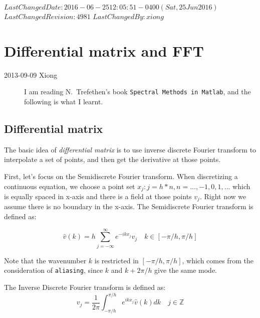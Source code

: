 \ifsvnmulti
 {$LastChangedDate: 2016-06-25 12:05:51 -0400 (Sat, 25 Jun 2016) $}
 {$LastChangedRevision: 4981 $} {$LastChangedBy: xiong $}
\fi


\section{Differential matrix and FFT}
\label{sect:DiffMat}


\begin{description}

\item[2013-09-09 Xiong]
I am reading N.~Trefethen's book \texttt{Spectral Methods in Matlab}, and
the following is what I learnt.
\end{description}



\subsection{Differential matrix}
The basic idea of \textit{differential matrix} is to use inverse discrete Fourier
transform to interpolate a set of points, and then get the derivative at those
points.

First, let's focus on the Semidiscrete Fourier transform. When discretizing a
continuous equation, we choose a point set
${x_{j}:j=h*n,n=..., -1,0,1,...}$ which is equally spaced in x-axis and there
is a field at those points $v_j$. Right now
we assume there is no boundary in the x-axis. The Semidiscrete Fourier transform
is defined as:

\begin{equation}
 \hat{v}(k)=h\sum_{j=-\infty}^{\infty}e^{-ikx_{j}}v_{j} \quad k\in  [-\pi/h,\pi/h]
\end{equation}

Note that the wavenumber $k$ is restricted in $[-\pi/h,\pi/h]$, which comes from the
consideration of \texttt{aliasing}, since $k$ and $k+2\pi/h$ give the same mode.

The Inverse Discrete Fourier transform is defined as:
\begin{equation}
 v_{j}=\frac{1}{2\pi}\int_{-\pi/h}^{\pi/h}e^{ikx_{j}}\hat{v}(k)dk \quad j\in \mathbb{Z}
\end{equation}

